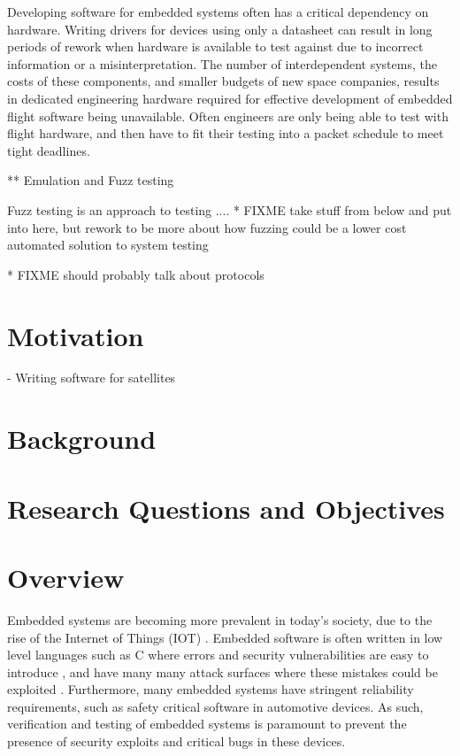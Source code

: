 \documentclass[../report.tex]{subfiles}
\begin{document}
Developing software for embedded systems often has a critical dependency on
hardware. Writing drivers for devices using only a datasheet can result in long
periods of rework when hardware is available to test against due to incorrect
information or a misinterpretation. The number of interdependent systems, the
costs of these components, and smaller budgets of new space companies, results
in dedicated engineering hardware required for effective development of
embedded flight software being unavailable. Often engineers are only being able
to test with flight hardware, and then have to fit their testing into a packet
schedule to meet tight deadlines.



** Emulation and Fuzz testing

Fuzz testing is an approach to testing ....
* FIXME take stuff from below and put into here, but rework to be more about how fuzzing could be a lower cost automated solution to system testing

* FIXME should probably talk about protocols

\section{Motivation}

- Writing software for satellites

\section{Background}

\section{Research Questions and Objectives}


\section{Overview}


Embedded systems are becoming more prevalent in today's society, due to the
rise of the Internet of Things (IOT) \citep{Abdumohasan_2021}. Embedded
software is often written in low level languages such as C where errors and
security vulnerabilities are easy to introduce \citep{Svoboda_2021}, and have
many many attack surfaces where these mistakes could be exploited
\citep{Abdumohasan_2021}. Furthermore, many embedded systems have stringent
reliability requirements, such as safety critical software in automotive
devices. As such, verification and testing of embedded systems is paramount to
prevent the presence of security exploits and critical bugs in these devices.
\end{document}
